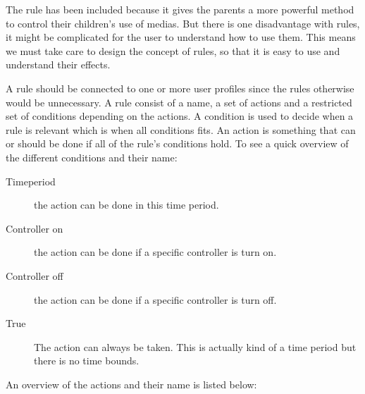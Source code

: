 The rule has been included because it gives the parents a more powerful method to control their children's use of medias. 
But there is one disadvantage with rules, it might be complicated for the user to understand how to use them. 
This means we must take care to design the concept of rules, so that it is easy to use and understand their effects.

A rule should be connected to one or more user profiles since the rules otherwise would be unnecessary. A rule consist of a name, a set of actions and  a restricted set of conditions depending on the actions. A condition is used to decide when a rule is relevant which is when all conditions fits. An action is something that can or should be done if all of the rule's conditions hold.
To see a quick overview of the different conditions and their name:

\begin{description}
	\item[Timeperiod] the action can be done in this time period.%
	\item[Controller on] the action can be done if a specific controller is turn on. 
	\item[Controller off] the action can be done if a specific controller is turn off. 
	\item[True] The action can always be taken. This is actually kind of a time period but there is no time bounds.
\end{description}

An overview of the actions and their name is listed below:

